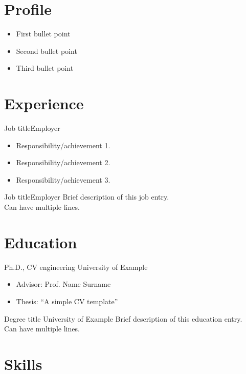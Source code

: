 \documentclass[a4paper, 11pt]{letter}
\begin{document}
\contact


\section{Profile}

\begin{itemize}

\item First bullet point

\item Second bullet point

\item Third bullet point

\end{itemize}



\section{Experience}

{Job title}{Employer}{
\begin{itemize}
\item Responsibility/achievement 1.
\item Responsibility/achievement 2.
\item Responsibility/achievement 3.
\end{itemize}
}

{Job title}{Employer}{
Brief description of this job entry.\\
Can have multiple lines.
}

\section{Education}

{Ph.D., CV engineering}
{University of Example}
{\begin{itemize}
\item Advisor: Prof. Name Surname
\item Thesis: ``A simple CV template''
\end{itemize}
}

{Degree title}
{University of Example}
{Brief description of this education entry.\\
Can have multiple lines.
}


\section{Skills}
\end{document}
